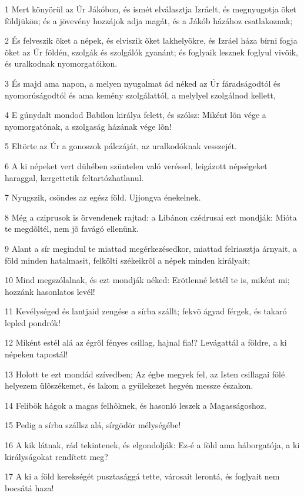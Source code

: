 \par 1 Mert könyörül az Úr Jákóbon, és ismét elválasztja Izráelt, és megnyugotja õket földjükön; és a jövevény hozzájok adja magát, és a Jákób házához csatlakoznak;
\par 2 És felveszik õket a népek, és elviszik õket lakhelyökre, és Izráel háza bírni fogja õket az Úr földén, szolgák és szolgálók gyanánt; és foglyaik lesznek foglyul vivõik, és uralkodnak nyomorgatóikon.
\par 3 És majd ama napon, a melyen nyugalmat ád néked az Úr fáradságodtól és nyomorúságodtól és ama kemény szolgálattól, a melylyel szolgálnod kellett,
\par 4 E gúnydalt mondod Babilon királya felett, és szólsz: Miként lõn vége a nyomorgatónak, a szolgaság házának vége lõn!
\par 5 Eltörte az Úr a gonoszok pálczáját, az uralkodóknak vesszejét.
\par 6 A ki népeket vert dühében szüntelen való veréssel, leigázott népségeket haraggal, kergettetik feltartózhatlanul.
\par 7 Nyugszik, csöndes az egész föld. Ujjongva énekelnek.
\par 8 Még a cziprusok is örvendenek rajtad: a Libánon czédrusai ezt mondják: Mióta te megdõltél, nem jõ favágó ellenünk.
\par 9 Alant a sír megindul te miattad megérkezésedkor, miattad felriasztja árnyait, a föld minden hatalmasit, felkölti székeikrõl a népek minden királyait;
\par 10 Mind megszólalnak, és ezt mondják néked: Erõtlenné lettél te is, miként mi; hozzánk hasonlatos levél!
\par 11 Kevélységed és lantjaid zengése a sírba szállt; fekvõ ágyad férgek, és takaró lepled pondrók!
\par 12 Miként estél alá az égrõl fényes csillag, hajnal fia!? Levágattál a földre, a ki népeken tapostál!
\par 13 Holott te ezt mondád szívedben; Az égbe megyek fel, az Isten csillagai fölé helyezem ülõszékemet, és lakom a gyülekezet hegyén messze északon.
\par 14 Felibök hágok a magas felhõknek, és hasonló leszek a Magasságoshoz.
\par 15 Pedig a sírba szállsz alá, sírgödör mélységébe!
\par 16 A kik látnak, rád tekintenek, és elgondolják: Ez-é a föld ama háborgatója, a ki királyságokat rendített meg?
\par 17 A ki a föld kerekségét pusztasággá tette, városait lerontá, és foglyait nem bocsátá haza!
